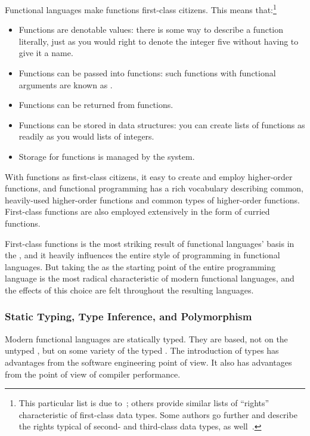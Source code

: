 Functional languages make functions first-class citizens. This means that:\footnote{This particular list is due to~\citet{Mody:Functional:1992}; others provide similar lists of ``rights'' characteristic of first-class data types. Some authors go further and describe the rights typical of second- and third-class data types, as well~\citep[for example][\S 3.5.2]{Scott:Programming:2006}.}
\begin{itemize}
\item
Functions are denotable values: there is some way to describe a function literally, just as you would right  to denote the integer five without having to give it a name.

\item
Functions can be passed into functions: such functions with functional arguments are known as .

\item
Functions can be returned from functions.

\item
Functions can be stored in data structures: you can create lists of functions as readily as you would lists of integers.

\item
Storage for functions is managed by the system.
\end{itemize}
With functions as first-class citizens, it easy to create and employ higher-order functions, and functional programming has a rich vocabulary describing common, heavily-used higher-order functions and common types of higher-order functions. First-class functions are also employed extensively in the form of curried functions.

First-class functions is the most striking result of functional languages' basis in the \lambdacalc{}, and it heavily influences the entire style of programming in functional languages. But taking the \lambdacalc as the starting point of the entire programming language is the most radical characteristic of modern functional languages, and the effects of this choice are felt throughout the resulting languages.

\subsubsection[Static Typing, Type Inference, Polymorphism]{Static Typing, Type Inference, and Polymorphism}
Modern functional languages are statically typed. They are based, not on the untyped \lambdacalc{}, but on some variety of the typed \lambdacalc{}. The introduction of types has advantages from the software engineering point of view. It also has advantages from the point of view of compiler performance.

